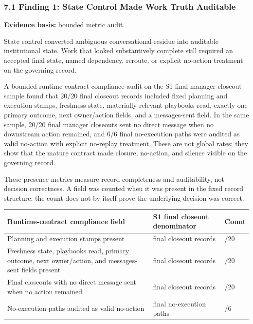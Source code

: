 \documentclass[
]{article}
\newcounter{none} %
\begin{document}
\subsubsection{7.1 Finding 1: State Control Made Work Truth Auditable}\label{finding-1-state-control-made-work-truth-auditable}

\textbf{Evidence basis:} bounded metric audit.

State control converted ambiguous conversational residue into auditable institutional state. Work that looked substantively complete still required an accepted final state, named dependency, reroute, or explicit no-action treatment on the governing record.

A bounded runtime-contract compliance audit on the S1 final manager-closeout sample found that 20/20 final closeout records included fixed planning and execution stamps, freshness state, materially relevant playbooks read, exactly one primary outcome, next owner/action fields, and a messages-sent field. In the same sample, 20/20 final manager closeouts sent no direct message when no downstream action remained, and 6/6 final no-execution paths were audited as valid no-action with explicit no-replay treatment. These are not global rates; they show that the mature contract made closure, no-action, and silence visible on the governing record.

These presence metrics measure record completeness and auditability, not decision correctness. A field was counted when it was present in the fixed record structure; the count does not by itself prove the underlying decision was correct.

{\def\LTcaptype{none} %
\begin{longtable}[]{@{}
  >{\raggedright\arraybackslash}p{}
  >{\raggedright\arraybackslash}p{}
  >{\raggedright\arraybackslash}p{}@{}}
\toprule\noalign{}
\begin{minipage}[b]{\linewidth}\raggedright
Runtime-contract compliance field
\end{minipage} & \begin{minipage}[b]{\linewidth}\raggedright
S1 final closeout denominator
\end{minipage} & \begin{minipage}[b]{\linewidth}\raggedright
Count
\end{minipage} \\
\midrule\noalign{}
\endhead
\bottomrule\noalign{}
\endlastfoot
Planning and execution stamps present & 20 final closeout records & 20/20 \\
Freshness state, playbooks read, primary outcome, next owner/action, and messages-sent fields present & 20 final closeout records & 20/20 \\
Final closeouts with no direct message sent when no action remained & 20 final closeout records & 20/20 \\
No-execution paths audited as valid no-action & 6 final no-execution paths & 6/6 \\
\end{longtable}
}
\end{document}
